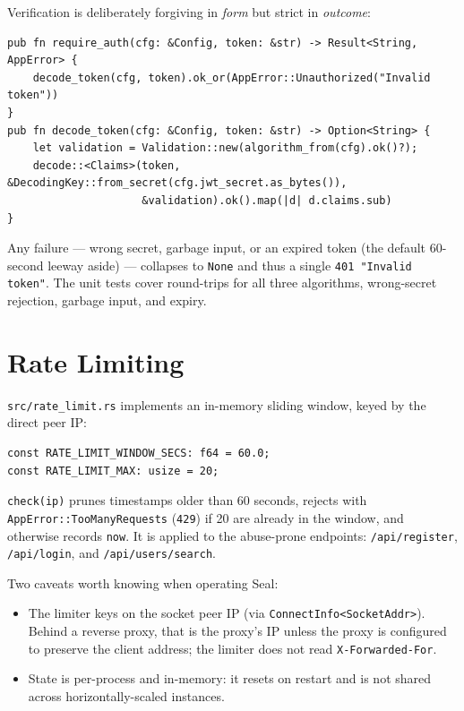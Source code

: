 Verification is deliberately forgiving in \emph{form} but strict in
\emph{outcome}:

\begin{lstlisting}
pub fn require_auth(cfg: &Config, token: &str) -> Result<String, AppError> {
    decode_token(cfg, token).ok_or(AppError::Unauthorized("Invalid token"))
}
pub fn decode_token(cfg: &Config, token: &str) -> Option<String> {
    let validation = Validation::new(algorithm_from(cfg).ok()?);
    decode::<Claims>(token, &DecodingKey::from_secret(cfg.jwt_secret.as_bytes()),
                     &validation).ok().map(|d| d.claims.sub)
}
\end{lstlisting}

Any failure --- wrong secret, garbage input, or an expired token (the default
60-second leeway aside) --- collapses to \verb|None| and thus a single
\verb|401 "Invalid token"|. The unit tests cover round-trips for all three
algorithms, wrong-secret rejection, garbage input, and expiry.

\section{Rate Limiting}

\verb|src/rate_limit.rs| implements an in-memory sliding window, keyed by the
direct peer IP:

\begin{lstlisting}
const RATE_LIMIT_WINDOW_SECS: f64 = 60.0;
const RATE_LIMIT_MAX: usize = 20;
\end{lstlisting}

\verb|check(ip)| prunes timestamps older than 60 seconds, rejects with
\verb|AppError::TooManyRequests| (\verb|429|) if 20 are already in the window, and
otherwise records \verb|now|. It is applied to the abuse-prone endpoints:
\verb|/api/register|, \verb|/api/login|, and \verb|/api/users/search|.

Two caveats worth knowing when operating Seal:

\begin{itemize}
  \item The limiter keys on the socket peer IP (via
        \verb|ConnectInfo<SocketAddr>|). Behind a reverse proxy, that is the
        proxy's IP unless the proxy is configured to preserve the client
        address; the limiter does not read \verb|X-Forwarded-For|.
  \item State is per-process and in-memory: it resets on restart and is not
        shared across horizontally-scaled instances.
\end{itemize}

